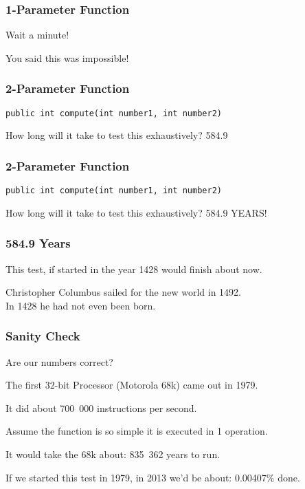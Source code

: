 \begin{frame}
\frametitle{1-Parameter Function}
\begin{changemargin}{1cm}

Wait a minute!

You said this was impossible!


\end{changemargin}
\end{frame}


\begin{frame}
\frametitle{2-Parameter Function}
\begin{changemargin}{1cm}

\texttt{public int compute(int number1, int number2)}

How long will it take to test this exhaustively? \alert{584.9}

\end{changemargin}
\end{frame}

\begin{frame}
\frametitle{2-Parameter Function}
\begin{changemargin}{1cm}

\texttt{public int compute(int number1, int number2)}

How long will it take to test this exhaustively? \alert{584.9 YEARS!}

\end{changemargin}
\end{frame}


\begin{frame}
\frametitle{584.9 Years}
\begin{changemargin}{1cm}

This test, if started in the year 1428 would finish about now.

Christopher Columbus sailed for the new world in 1492.\\
\quad In 1428 he had not even been born.

\end{changemargin}
\end{frame}

\begin{frame}
\frametitle{Sanity Check}
\begin{changemargin}{1cm}
Are our numbers correct? 

The first 32-bit Processor (Motorola 68k) came out in 1979.

It did about 700~000 instructions per second. 

Assume the function is so simple it is executed in 1 operation.

It would take the 68k about: \alert{835~362} years to run. 

If we started this test in 1979, in 2013 we'd be about: \alert{0.00407\%} done.

\end{changemargin}
\end{frame}

